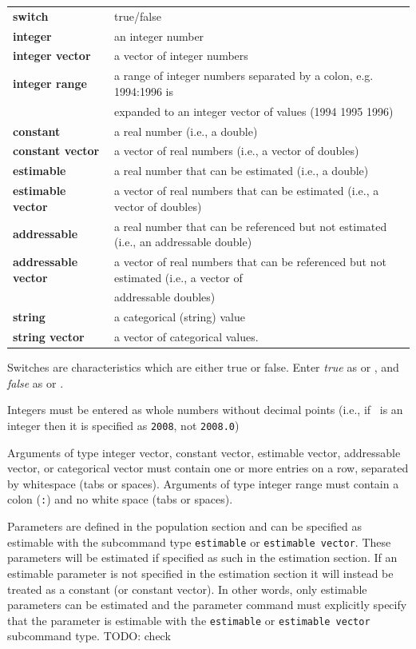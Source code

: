 \begin{tabular}{ll}
\textbf{switch} & true/false \\
\textbf{integer}& an integer number \\
\textbf{integer vector} & a vector of integer numbers \\
\textbf{integer range} & a range of integer numbers separated by a colon, e.g. 1994:1996 is \\ & expanded to an integer vector of values (1994 1995 1996) \\
\textbf{constant} & a real number (i.e., a double) \\
\textbf{constant vector} & a vector of real numbers (i.e., a vector of doubles) \\
\textbf{estimable} & a real number that can be estimated (i.e., a double) \\
\textbf{estimable vector} & a vector of real numbers that can be estimated (i.e., a vector of doubles) \\
\textbf{addressable} & a real number that can be referenced but not estimated (i.e., an addressable double) \\
\textbf{addressable vector} & a vector of real numbers that can be referenced but not estimated (i.e., a vector of \\ & addressable doubles) \\
\textbf{string} & a categorical (string) value \\
\textbf{string vector} & a vector of categorical values.
\end{tabular}

Switches are characteristics which are either true or false. Enter \emph{true} as  or , and \emph{false} as  or .

Integers must be entered as whole numbers without decimal points (i.e., if \ is an integer then it is specified as \texttt{2008}, not \texttt{2008.0})

Arguments of type integer vector, constant vector, estimable vector, addressable vector, or categorical vector must contain one or more entries on a row, separated by whitespace (tabs or spaces). Arguments of type integer range must contain a colon (\texttt{:}) and no white space (tabs or spaces).

Parameters are defined in the population section and can be specified as estimable with the subcommand type \texttt{estimable} or \texttt{estimable vector}.  These parameters will be estimated if specified as such in the estimation section. If an estimable parameter is not specified in the estimation section it will instead be treated as a constant (or constant vector). In other words, only estimable parameters can be estimated and the parameter command must explicitly specify that the parameter is estimable with the \texttt{estimable} or \texttt{estimable vector} subcommand type. TODO: check

